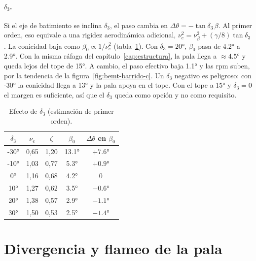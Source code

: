 \paragraph{$\delta_3$.} Si el eje de batimiento se inclina $\delta_3$, el paso cambia en
$\Delta\theta=-\tan\delta_3\,\beta$. Al primer orden, eso equivale a una rigidez
aerodinámica adicional, $\nu_e^2=\nu_\beta^2+(\gamma/8)\tan\delta_3$. La conicidad baja
como $\beta_0\propto1/\nu_e^2$ (tabla~\ref{tab:estabilidad-d3}). Con $\delta_3=\ang{20}$, $\beta_0$ pasa de
\ang{4.2} a \ang{2.9}. Con la misma ráfaga del capítulo~\ref{cap:estructura}, la pala
llega a $\approx\ang{4.5}$ y queda lejos del tope de \ang{+15}. A cambio, el paso efectivo
baja \ang{1.1} y las rpm suben, por la tendencia de la figura~\ref{fig:bemt-barrido-c}.
Un $\delta_3$ negativo es peligroso: con \ang{-30} la conicidad llega a \ang{13} y la pala
apoya en el tope. Con el tope a \ang{+15} y $\delta_3=0$ el margen es suficiente, así que
el $\delta_3$ queda como opción y no como requisito.

\begin{table}[H]
\centering\small
\caption{Efecto de $\delta_3$ (estimación de primer orden).}
\label{tab:estabilidad-d3}
\begin{tabular}{@{}ccccc@{}}
\toprule
$\delta_3$ & $\nu_e$ & $\zeta$ & $\beta_0$ & $\Delta\theta$ en $\beta_0$\\\midrule
\ang{-30} & 0,65 & 1,20 & \ang{13.1} & $+\ang{7.6}$\\
\ang{-10} & 1,03 & 0,77 & \ang{5.3} & $+\ang{0.9}$\\
\ang{0}   & 1,16 & 0,68 & \ang{4.2} & 0\\
\ang{10}  & 1,27 & 0,62 & \ang{3.5} & $-\ang{0.6}$\\
\ang{20}  & 1,38 & 0,57 & \ang{2.9} & $-\ang{1.1}$\\
\ang{30}  & 1,50 & 0,53 & \ang{2.5} & $-\ang{1.4}$\\
\bottomrule
\end{tabular}
\end{table}

\section{Divergencia y flameo de la pala}\label{sec:estabilidad-flameo}

